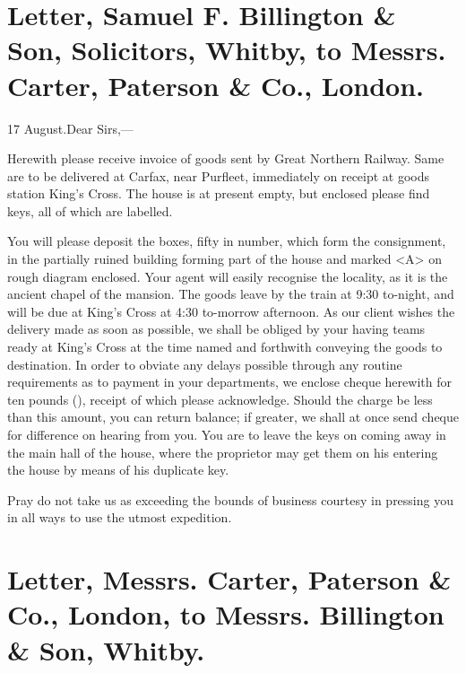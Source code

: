 \begin{letter}
	\clearpage
\end{letter}

\section{Letter, Samuel F\@. Billington \& Son, Solicitors, Whitby, to Messrs. Carter, Paterson \& Co., London.}

\begin{mail}{17 August.}{Dear Sirs,— }

Herewith please receive invoice of goods sent by Great Northern Railway. Same are to be delivered at Carfax, near Purfleet, immediately on receipt at goods station King's Cross. The house is at present empty, but enclosed please find keys, all of which are labelled.

You will please deposit the boxes, fifty in number, which form the consignment, in the partially ruined building forming part of the house and marked <A> on rough diagram enclosed. Your agent will easily recognise the locality, as it is the ancient chapel of the mansion. The goods leave by the train at 9:30 to-night, and will be due at King's Cross at 4:30 to-morrow afternoon. As our client wishes the delivery made as soon as possible, we shall be obliged by your having teams ready at King's Cross at the time named and forthwith conveying the goods to destination. In order to obviate any delays possible through any routine requirements as to payment in your departments, we enclose cheque herewith for ten pounds (), receipt of which please acknowledge. Should the charge be less than this amount, you can return balance; if greater, we shall at once send cheque for difference on hearing from you. You are to leave the keys on coming away in the main hall of the house, where the proprietor may get them on his entering the house by means of his duplicate key.

Pray do not take us as exceeding the bounds of business courtesy in pressing you in all ways to use the utmost expedition.

\begin{letter}
	\enlargethispage{\baselineskip}
\end{letter}

\end{mail}


\section{Letter, Messrs. Carter, Paterson \& Co., London, to Messrs. Billington \& Son, Whitby.}


